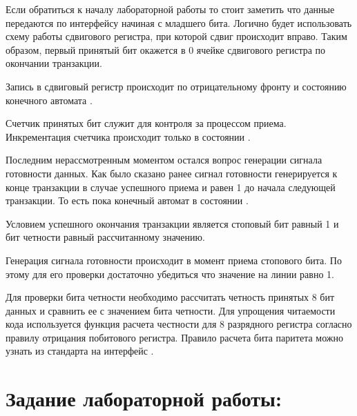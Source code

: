 \par{Если обратиться к началу лабораторной работы то стоит заметить что данные передаются по интерфейсу  начиная с младшего бита. Логично будет использовать схему работы сдвигового регистра, при которой сдвиг происходит вправо. Таким образом, первый принятый бит окажется в 0 ячейке сдвигового регистра по окончании транзакции.}

\par{Запись в сдвиговый регистр происходит по отрицательному фронту  и состоянию конечного автомата .}



\par{Счетчик принятых бит служит для контроля за процессом приема. Инкрементация счетчика происходит только в состоянии .}



\par{Последним нерассмотренным моментом остался вопрос генерации сигнала готовности данных. Как было сказано ранее сигнал готовности генерируется к конце транзакции в случае успешного приема и равен 1 до начала следующей транзакции. То есть пока конечный автомат в состоянии .}

\par{Условием успешного окончания транзакции является стоповый бит равный 1 и бит четности равный рассчитанному значению.}

\par{Генерация сигнала готовности происходит в момент приема стопового бита. По этому для его проверки достаточно убедиться что значение на линии  равно 1.}

\par{Для проверки бита четности необходимо рассчитать четность принятых 8 бит данных и сравнить ее с значением бита четности. Для упрощения читаемости кода используется функция расчета честности для 8 разрядного регистра согласно правилу отрицания побитового  регистра. Правило расчета бита паритета можно узнать из стандарта на интерфейс .}

\section{Задание лабораторной работы:}

